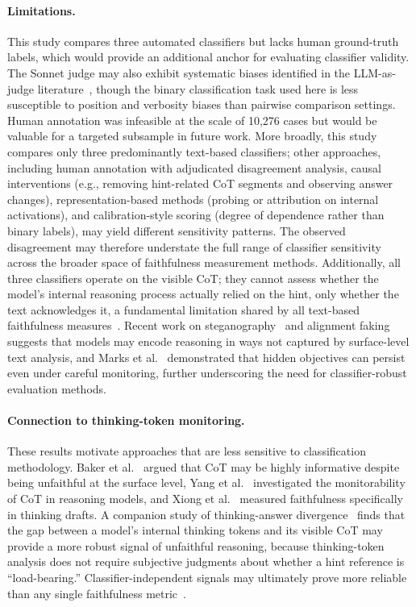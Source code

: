 \paragraph{Limitations.} This study compares three automated classifiers but lacks human ground-truth labels, which would provide an additional anchor for evaluating classifier validity. The Sonnet judge may also exhibit systematic biases identified in the LLM-as-judge literature~\cite{gu2024survey, ye2024justice}, though the binary classification task used here is less susceptible to position and verbosity biases than pairwise comparison settings. Human annotation was infeasible at the scale of 10,276 cases but would be valuable for a targeted subsample in future work. More broadly, this study compares only three predominantly text-based classifiers; other approaches, including human annotation with adjudicated disagreement analysis, causal interventions (e.g., removing hint-related CoT segments and observing answer changes), representation-based methods (probing or attribution on internal activations), and calibration-style scoring (degree of dependence rather than binary labels), may yield different sensitivity patterns. The observed disagreement may therefore understate the full range of classifier sensitivity across the broader space of faithfulness measurement methods. Additionally, all three classifiers operate on the visible CoT; they cannot assess whether the model's internal reasoning process actually relied on the hint, only whether the text acknowledges it, a fundamental limitation shared by all text-based faithfulness measures~\cite{arcuschin2025wild}. Recent work on steganography~\cite{roger2023steganography} and alignment faking~\cite{greenblatt2024alignment} suggests that models may encode reasoning in ways not captured by surface-level text analysis, and Marks et al.~\cite{marks2025auditing} demonstrated that hidden objectives can persist even under careful monitoring, further underscoring the need for classifier-robust evaluation methods.

\paragraph{Connection to thinking-token monitoring.} These results motivate approaches that are less sensitive to classification methodology. Baker et al.~\cite{baker2025cot} argued that CoT may be highly informative despite being unfaithful at the surface level, Yang et al.~\cite{yang2025monitorability} investigated the monitorability of CoT in reasoning models, and Xiong et al.~\cite{xiong2025thinking} measured faithfulness specifically in thinking drafts. A companion study of thinking-answer divergence~\cite{young2026suppression} finds that the gap between a model's internal thinking tokens and its visible CoT may provide a more robust signal of unfaithful reasoning, because thinking-token analysis does not require subjective judgments about whether a hint reference is ``load-bearing.'' Classifier-independent signals may ultimately prove more reliable than any single faithfulness metric~\cite{zhang2025probing}.
